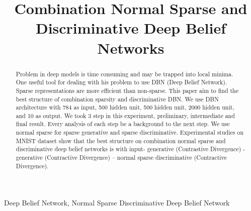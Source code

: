\documentclass[conference]{IEEEtran}
\begin{document}
\title{Combination Normal Sparse and Discriminative Deep Belief Networks}

\author{
\and

}

\maketitle

\begin{abstract}
Problem in deep models is time consuming and may
be trapped into local minima. One useful tool for dealing with his
problem to use DBN (Deep Belief Network). Sparse
representations are more efficient than non-sparse. This paper
aim to find the best structure of combination sparsity and
discriminative DBN. We use DBN architecture with 784 as input,
500 hidden unit, 500 hidden unit, 2000 hidden unit, and 10 as
output. We took 3 step in this experiment, preliminary,
intermediate and final result. Every analysis of each step be a
background to the next step. We use normal sparse for sparse
generative and sparse discriminative. Experimental studies on
MNIST dataset show that the best structure on combination
normal sparse and discriminative deep belief networks is with
input- generative (Contrastive Divergence) - generative
(Contractive Divergence) – normal sparse
discriminative
(Contractive Divergence).
\end{abstract}

\begin{IEEEkeywords}
Deep Belief Network, Normal Sparse Discriminative Deep Belief Network
\end{IEEEkeywords}

\IEEEpeerreviewmaketitle
\end{document}
